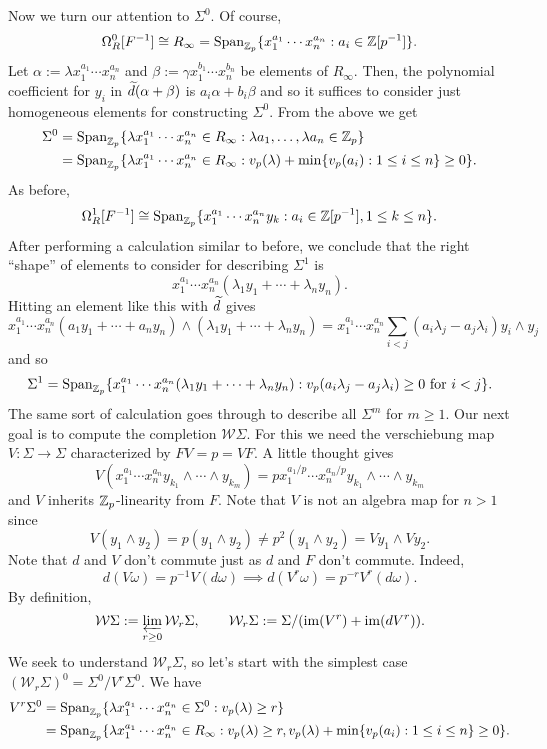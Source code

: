 \documentclass[11pt]{article}
\newcommand{\W}{\mathcal{W}}
\begin{document}
Now we turn our attention to $\Sigma^0$. Of course,
$$\Omega_R^0[F^{-1}]\cong R_{\infty}=\operatorname{Span}_{\mathbb{Z}_p}\{x_1^{a_1}\cdots x_n^{a_n} : a_i\in\mathbb{Z}[p^{-1}]\}.$$
Let $\alpha:=\lambda x_1^{a_1}\cdots x_n^{a_n}$ and $\beta:=\gamma x_1^{b_1}\cdots x_n^{b_n}$ be elements of $R_{\infty}$. Then, the polynomial coefficient for $y_i$ in $\widetilde{d}(\alpha+\beta)$ is $a_i\alpha+b_i\beta$ and so it suffices to consider just homogeneous elements for constructing $\Sigma^0$. From the above we get 
\begin{align*}
\Sigma^0
&=\operatorname{Span}_{\mathbb{Z}_p}\{\lambda x_1^{a_1}\cdots x_n^{a_n}\in R_{\infty} : \lambda a_1,\ldots,\lambda a_n\in\mathbb{Z}_p\} \\
&=\operatorname{Span}_{\mathbb{Z}_p}\{\lambda x_1^{a_1}\cdots x_n^{a_n}\in R_{\infty} : v_p(\lambda)+\min\{v_p(a_i) : 1\leq i\leq n\}\geq0\}. 
\end{align*}
As before,
$$\Omega_R^1[F^{-1}]\cong\operatorname{Span}_{\mathbb{Z}_p}\{x_1^{a_1}\cdots x_n^{a_n}y_k : a_i\in\mathbb{Z}[p^{-1}],1\leq k\leq n\}.$$
After performing a calculation similar to before, we conclude that the right ``shape'' of elements to consider for describing $\Sigma^1$ is 
$$x_1^{a_1}\cdots x_n^{a_n}(\lambda_1y_1+\cdots+\lambda_ny_n).$$
Hitting an element like this with $\widetilde{d}$ gives
$$x_1^{a_1}\cdots x_n^{a_n}(a_1y_1+\cdots+a_ny_n)\wedge(\lambda_1y_1+\cdots+\lambda_ny_n)=x_1^{a_1}\cdots x_n^{a_n}\sum_{i<j}(a_i\lambda_j-a_j\lambda_i)y_i\wedge y_j$$
and so 
$$\Sigma^1=\operatorname{Span}_{\mathbb{Z}_p}\{x_1^{a_1}\cdots x_n^{a_n}(\lambda_1y_1+\cdots+\lambda_ny_n) : v_p(a_i\lambda_j-a_j\lambda_i)\geq0\textrm{ for }i<j\}.$$
The same sort of calculation goes through to describe all $\Sigma^m$ for $m\geq1$. Our next goal is to compute the completion $\W\Sigma$. For this we need the verschiebung map $V: \Sigma\to\Sigma$ characterized by $FV=p=VF$. A little thought gives 
$$V(x_1^{a_1}\cdots x_n^{a_n}y_{k_1}\wedge\cdots\wedge y_{k_m})=px_1^{a_1/p}\cdots x_n^{a_n/p}y_{k_1}\wedge\cdots\wedge y_{k_m}$$
and $V$ inherits $\mathbb{Z}_p$-linearity from $F$. Note that $V$ is not an algebra map for $n>1$ since
$$V(y_1\wedge y_2)=p(y_1\wedge y_2)\neq p^2(y_1\wedge y_2)=Vy_1\wedge Vy_2.$$
Note that $d$ and $V$ don't commute just as $d$ and $F$ don't commute. Indeed,
$$d(V\omega)=p^{-1}V(d\omega)\implies d(V^r\omega)=p^{-r}V^r(d\omega).$$
By definition,
$$\W\Sigma:=\flim_{r\geq0}\W_r\Sigma,\qquad \W_r\Sigma:=\Sigma/(\im(V^r)+\im(dV^r)).$$
We seek to understand $\W_r\Sigma$, so let's start with the simplest case $(\W_r\Sigma)^0=\Sigma^0/V^r\Sigma^0$. We have
\begin{align*}
V^r\Sigma^0
&=\operatorname{Span}_{\mathbb{Z}_p}\{\lambda x_1^{a_1}\cdots x_n^{a_n}\in\Sigma^0 : v_p(\lambda)\geq r\} \\
&=\operatorname{Span}_{\mathbb{Z}_p}\{\lambda x_1^{a_1}\cdots x_n^{a_n}\in R_{\infty} : v_p(\lambda)\geq r,v_p(\lambda)+\min\{v_p(a_i) : 1\leq i\leq n\}\geq0\}.
\end{align*}
\end{document}
